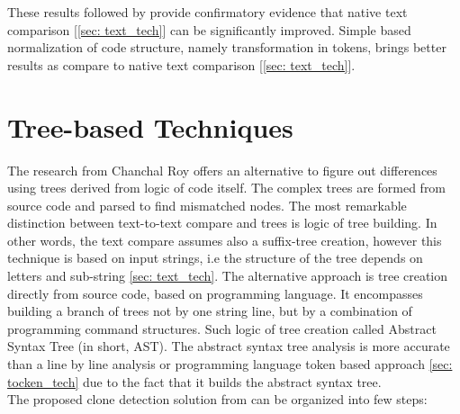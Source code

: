 \documentclass{report}
\begin{document}
These results followed by \cite{tocken_kamiya} provide confirmatory evidence that native text comparison [\ref{sec: text_tech}] can be significantly improved. Simple based normalization of code structure, namely transformation in tokens,  brings better results as compare to native text comparison [\ref{sec: text_tech}]. 


\section{Tree-based Techniques}
\label{sec: tree_tech}
The research from Chanchal Roy \cite{software_clone_detection} offers an alternative to figure out differences using trees derived from logic of code itself. The complex trees are formed from source code and parsed to find mismatched nodes. The most remarkable distinction between text-to-text compare and trees is logic of tree building. In other words, the text compare assumes also a suffix-tree creation, however this technique is based on input strings, i.e the structure of the tree depends on letters and sub-string \ref{sec: text_tech}. The alternative approach is tree creation directly from source code, based on programming language. It encompasses building a branch of trees not by one string line, but by a combination of programming command structures. Such logic of tree creation called Abstract Syntax Tree (in short, AST). The abstract syntax tree analysis is more accurate than a line by line analysis or programming language token based approach \ref{sec: tocken_tech} due to the fact that it builds the abstract syntax tree.\\
The proposed clone detection solution from \cite{flavius} can be organized into few steps:
\end{document}

